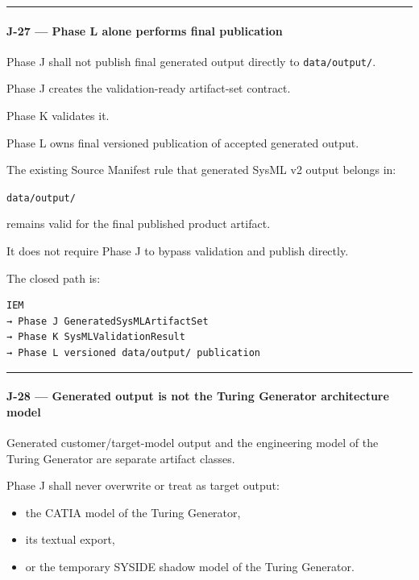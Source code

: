 \begin{center}\rule{0.5\linewidth}{0.5pt}\end{center}

\hypertarget{j-27--phase-l-alone-performs-final-publication}{%
\paragraph{J-27 --- Phase L alone performs final publication}\label{j-27--phase-l-alone-performs-final-publication}}

Phase J shall not publish final generated output directly to \texttt{data/output/}.

Phase J creates the validation-ready artifact-set contract.

Phase K validates it.

Phase L owns final versioned publication of accepted generated output.

The existing Source Manifest rule that generated SysML v2 output belongs in:

\texttt{data/output/}

remains valid for the final published product artifact.

It does not require Phase J to bypass validation and publish directly.

The closed path is:

\begin{verbatim}
IEM
→ Phase J GeneratedSysMLArtifactSet
→ Phase K SysMLValidationResult
→ Phase L versioned data/output/ publication
\end{verbatim}

\begin{center}\rule{0.5\linewidth}{0.5pt}\end{center}

\hypertarget{j-28--generated-output-is-not-the-turing-generator-architecture-model}{%
\paragraph{J-28 --- Generated output is not the Turing Generator architecture model}\label{j-28--generated-output-is-not-the-turing-generator-architecture-model}}

Generated customer/target-model output and the engineering model of the Turing Generator are separate artifact classes.

Phase J shall never overwrite or treat as target output:

\begin{itemize}
\tightlist
\item
  the CATIA model of the Turing Generator,
\item
  its textual export,
\item
  or the temporary SYSIDE shadow model of the Turing Generator.
\end{itemize}

